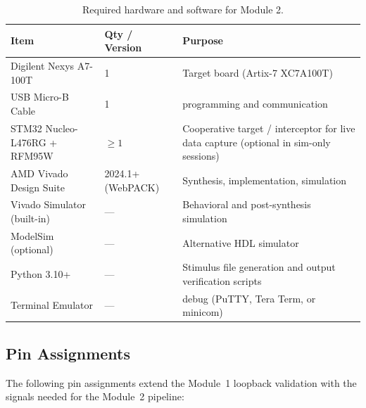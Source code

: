 \documentclass[11pt,letterpaper]{article}
\begin{document}
	\begin{table}[ht!]
		\centering
		\caption{Required hardware and software for Module 2.}
		\label{tab:hw_sw}
		\renewcommand{\arraystretch}{1.3}
		\begin{tabularx}{\textwidth}{l l X}
			\toprule
			\textbf{Item} & \textbf{Qty / Version} & \textbf{Purpose} \\
			\midrule
			Digilent Nexys A7-100T & 1 & Target \FPGA{} board (Artix-7 XC7A100T) \\
			USB Micro-B Cable & 1 & \FPGA{} programming and \UART{} communication \\
			STM32 Nucleo-L476RG + RFM95W & $\geq 1$ & Cooperative target / interceptor for live data capture (optional in sim-only sessions) \\
			AMD Vivado Design Suite & 2024.1+ (WebPACK) & Synthesis, implementation, simulation \\
			Vivado Simulator (built-in) & --- & Behavioral and post-synthesis simulation \\
			ModelSim (optional) & --- & Alternative HDL simulator \\
			Python 3.10+ & --- & Stimulus file generation and output verification scripts \\
			Terminal Emulator & --- & \UART{} debug (PuTTY, Tera Term, or minicom) \\
			\bottomrule
		\end{tabularx}
	\end{table}

	\subsection{\FPGA{} Pin Assignments}

	The following pin assignments extend the Module~1 loopback validation with the signals needed for the Module~2 pipeline:
\end{document}
